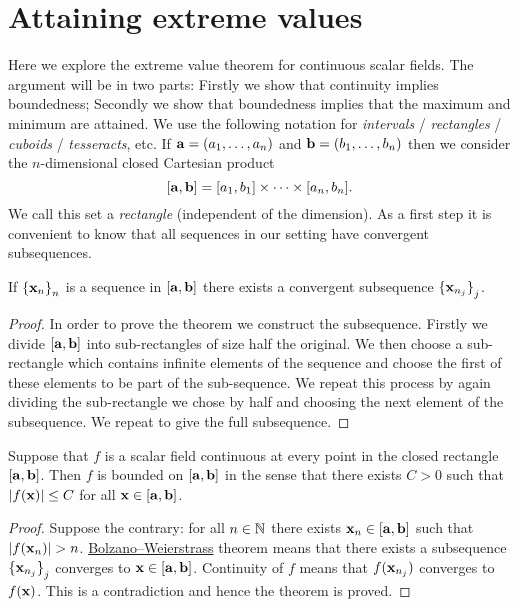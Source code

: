 \section{Attaining extreme values}

Here we explore the extreme value theorem for continuous scalar fields.
The argument will be in two parts:
Firstly we show that continuity implies boundedness;
Secondly we show that boundedness implies that the maximum and minimum are attained.
We use the following notation for \emph{intervals} / \emph{rectangles} / \emph{cuboids} / \emph{tesseracts}, etc.
If \(\aa = (a_1,\ldots,a_n)\) and  \(\bb = (b_1,\ldots,b_n)\)
then we consider the \(n\)-dimensional closed Cartesian product
\[
    [\aa,\bb] = [a_1,b_1] \times \cdots \times [a_n,b_n].
\]
We call this set a \emph{rectangle} (independent of the dimension).
As a first step it is convenient to know that all sequences in our setting have convergent subsequences.

\begin{theorem}
    If \({\{\xx_{n}\}}_{n}\) is a sequence in \( [\aa,\bb]\)
    there exists a convergent subsequence \({\{\xx_{n_j}\}}_{j}\).
\end{theorem}

\begin{proof}
    In order to prove the theorem we construct the subsequence.
    Firstly we divide \( [\aa,\bb]\) into sub-rectangles of size half the original.
    We then choose a sub-rectangle which contains infinite elements of the sequence and choose the first of these elements to be part of the sub-sequence.
    We repeat this process by again dividing the sub-rectangle we chose by half and choosing the next element of the subsequence.
    We repeat to give the full subsequence.
\end{proof}

\begin{theorem}
    Suppose that \(f\) is a scalar field continuous at every point in the closed rectangle \([\aa,\bb]\).
    Then \(f\) is bounded on \([\aa,\bb]\) in the sense that there exists \(C>0\) such that \(\abs{f(\xx)} \leq C\) for all \(\xx \in [\aa,\bb]\).
\end{theorem}

\begin{proof}
    Suppose the contrary: for all \(n\in\bN\) there exists \(\xx_n\in [\aa,\bb]\) such that \(\abs{f(\xx_n)}>n\).
    \href{https://en.wikipedia.org/wiki/Bolzano%E2%80%93Weierstrass_theorem}{Bolzano–Weierstrass} theorem means that there exists a subsequence \({\{\xx_{n_j}\}}_{j}\) converges to \( \xx \in [\aa,\bb]\).
    Continuity of \(f\) means that \(f(\xx_{n_j})\) converges to \(f(\xx)\). This is a contradiction and hence the theorem is proved.
\end{proof}



